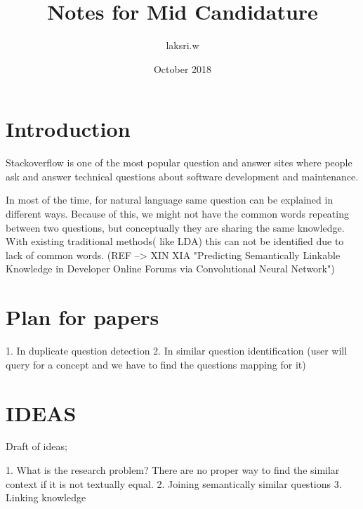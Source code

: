 \documentclass{article}
\title{Notes for Mid Candidature}
\author{laksri.w }
\date{October 2018}
\begin{document}
\maketitle

\section{Introduction}
Stackoverflow is one of the most popular question and answer sites where people ask and answer technical questions about software development and maintenance. 

In most of the time, for natural language same question can be explained in different ways. Because of this, we might not have the common words repeating between two questions, but conceptually they are sharing the same knowledge. With existing traditional methods( like LDA) this can not be identified due to lack of common words. (REF --> XIN XIA "Predicting Semantically Linkable Knowledge in Developer Online Forums via Convolutional Neural Network")

\section{Plan for papers}
1. In duplicate question detection
2. In similar question identification (user will query for a concept and we have to find the questions mapping for it)

\section{IDEAS}
Draft of ideas;

1. What is the research problem?
There are no proper way to find the similar context if it is not textually equal. 
2. Joining semantically similar questions
3. Linking knowledge
\end{document}

